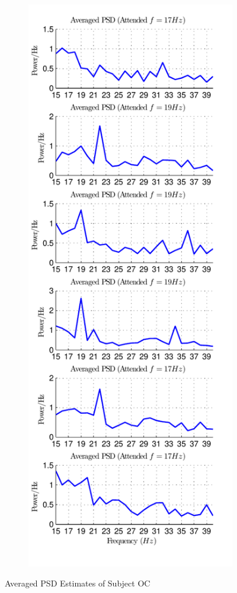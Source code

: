 \documentclass[12pt]{article}
\numberwithin{equation}{section}
\numberwithin{figure}{section}
\numberwithin{table}{section}
\begin{document}
\begin{figure}
\begin{subfigure}{.5\textwidth}
        \label{fig:results_oc_1}
    \end{subfigure}%
    \begin{subfigure}{.5\textwidth}
        \centering
        \includegraphics[scale=0.85]{images/results-psd-OC_23-01-2014-19-56}
        \label{fig:results_oc_2}
    \end{subfigure}
    \vspace*{-1cm}\caption{Averaged PSD Estimates of Subject OC}
    \label{fig:results_OC}
\end{figure}
\end{document}

